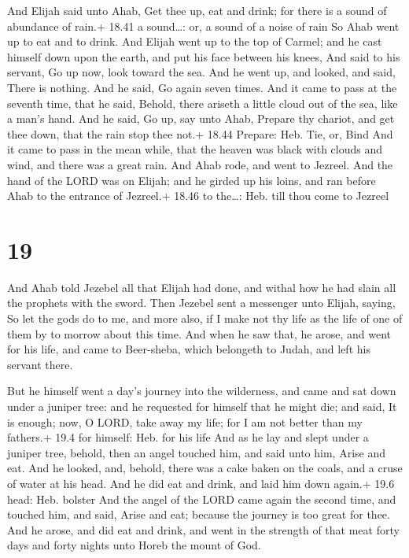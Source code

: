  And Elijah said unto Ahab, Get thee up, eat and drink;
for there is a sound of abundance of rain.+ 18.41 a sound\ldots: or, a
sound of a noise of rain  So Ahab went up to eat and to
drink. And Elijah went up to the top of Carmel; and he cast himself down
upon the earth, and put his face between his knees,  And
said to his servant, Go up now, look toward the sea. And he went up, and
looked, and said, There is nothing. And he said, Go again seven times.
 And it came to pass at the seventh time, that he said,
Behold, there ariseth a little cloud out of the sea, like a man's hand.
And he said, Go up, say unto Ahab, Prepare thy chariot, and get thee
down, that the rain stop thee not.+ 18.44 Prepare: Heb. Tie, or, Bind
 And it came to pass in the mean while, that the heaven was
black with clouds and wind, and there was a great rain. And Ahab rode,
and went to Jezreel.  And the hand of the LORD was on
Elijah; and he girded up his loins, and ran before Ahab to the entrance
of Jezreel.+ 18.46 to the\ldots: Heb. till thou come to Jezreel

\hypertarget{section-18}{%
\section{19}\label{section-18}}

 And Ahab told Jezebel all that Elijah had done, and withal
how he had slain all the prophets with the sword.  Then
Jezebel sent a messenger unto Elijah, saying, So let the gods do to me,
and more also, if I make not thy life as the life of one of them by to
morrow about this time.  And when he saw that, he arose, and
went for his life, and came to Beer-sheba, which belongeth to Judah, and
left his servant there.

 But he himself went a day's journey into the wilderness,
and came and sat down under a juniper tree: and he requested for himself
that he might die; and said, It is enough; now, O LORD, take away my
life; for I am not better than my fathers.+ 19.4 for himself: Heb. for
his life  And as he lay and slept under a juniper tree,
behold, then an angel touched him, and said unto him, Arise and eat.
 And he looked, and, behold, there was a cake baken on the
coals, and a cruse of water at his head. And he did eat and drink, and
laid him down again.+ 19.6 head: Heb. bolster  And the angel
of the LORD came again the second time, and touched him, and said, Arise
and eat; because the journey is too great for thee.  And he
arose, and did eat and drink, and went in the strength of that meat
forty days and forty nights unto Horeb the mount of God.

